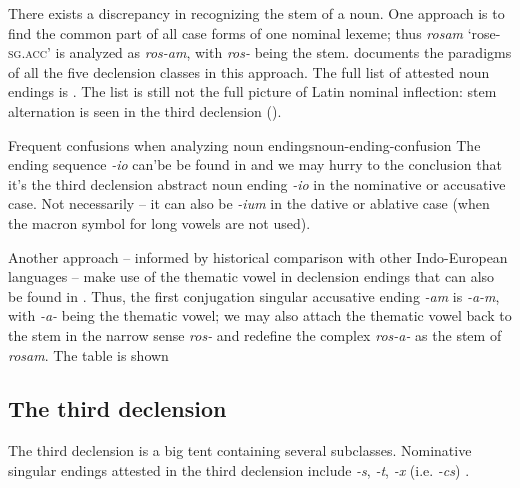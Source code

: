 \documentclass[a4paper, oneside]{report}
\newcommand*{\citesec}[1]{\S~{#1}}
\newcommand*{\citepage}[1]{p.~{#1}}
\newcommand*{\citepages}[1]{pp.~{#1}}
\newcommand{\form}[1]{\emph{#1}}
\newcommand*{\category}[1]{\textsc{#1}}
\newcommand{\translate}[1]{`#1'}
\begin{document}
There exists a discrepancy in recognizing the stem of a noun.
One approach is to find the common part 
of all case forms of one nominal lexeme;
thus \form{rosam} \translate{rose-\category{sg}.\category{acc}}
is analyzed as \form{ros-am}, 
with \form{ros-} being the stem.
\citet[\citepage{17}]{allen1903allen} documents the paradigms of all the five declension classes 
in this approach.
The full list of attested noun endings is .
The list is still not the full picture of Latin nominal inflection:
stem alternation is seen in the third declension
().

\begin{table}[H]
    \caption{Declension endings; Roman numerals are declension classes}
    \label{tbl:declension-ending-nouns-list}
    \centering
    
\end{table}

\begin{infobox}{Frequent confusions when analyzing noun endings}{noun-ending-confusion}
    The ending sequence \form{-io} can'be be found in 
    and we may hurry to the conclusion 
    that it's the third declension abstract noun ending \form{-io} 
    in the nominative or accusative case.
    Not necessarily -- 
    it can also be \form{-ium} in the dative or ablative case 
    (when the macron symbol for long vowels are not used).
\end{infobox}

Another approach -- informed by historical comparison with other Indo-European languages -- 
make use of the thematic vowel 
in declension endings that can also be found in
\citep[\citepages{45, 63}]{oniga2014latin}.
Thus, the first conjugation singular accusative ending \form{-am} 
is \form{-a-m}, 
with \form{-a-} being the thematic vowel;
we may also attach the thematic vowel back to the stem in the narrow sense \form{ros-} 
and redefine the complex \form{ros-a-} as the stem of \form{rosam}.
The table is shown 

\subsection{The third declension}\label{sec:np.inflection.3}

The third declension is a big tent containing several subclasses.
Nominative singular endings attested in the third declension
include \form{-s}, \form{-t}, \form{-x} (i.e. \form{-cs}) \citep[\citesec{53}]{allen1903allen}.
\end{document}
